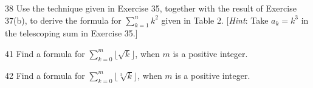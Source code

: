 \documentclass[11pt]{article}
\begin{document}
\begin{exercise}{38}
    Use the technique given in Exercise 35, together with the result of
    Exercise 37(b), to derive the formula for
    $\displaystyle\sum_{k=1}^{n} k^2$ given in Table 2.
    [\emph{Hint}: Take $a_k = k^3$ in the telescoping sum in Exercise
    35.]
\end{exercise}

\begin{exercise}{41}
    Find a formula for $\displaystyle\sum_{k=0}^{m} \lfloor\sqrt{k}\rfloor$,
    when $m$ is a positive integer.
\end{exercise}

\begin{exercise}{42}
    Find a formula for $\displaystyle\sum_{k=0}^{m} \lfloor\sqrt[3]{k}\rfloor$,
    when $m$ is a positive integer.
\end{exercise}
\end{document}
